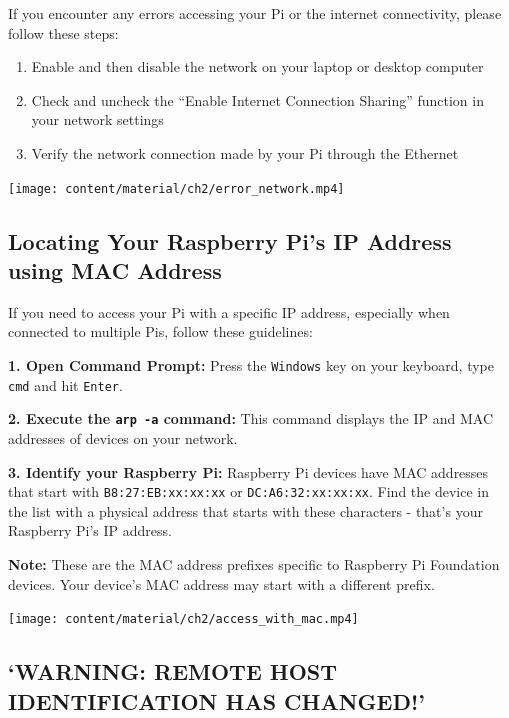 \documentclass[
  letterpaper,
]{scrbook}
\providecommand{\tightlist}{%
  \setlength{\itemsep}{0pt}\setlength{\parskip}{0pt}}\usepackage{longtable,booktabs,array}
\begin{document}
If you encounter any errors accessing your Pi or the internet
connectivity, please follow these steps:

\begin{enumerate}
\def\labelenumi{\arabic{enumi}.}
\tightlist
\item
  Enable and then disable the network on your laptop or desktop computer
\item
  Check and uncheck the ``Enable Internet Connection Sharing'' function
  in your network settings
\item
  Verify the network connection made by your Pi through the Ethernet
\end{enumerate}

\texttt{[image: content/material/ch2/error\_network.mp4]}

\hypertarget{locating-your-raspberry-pis-ip-address-using-mac-address}{%
\subsection{Locating Your Raspberry Pi's IP Address using MAC
Address}\label{locating-your-raspberry-pis-ip-address-using-mac-address}}

If you need to access your Pi with a specific IP address, especially
when connected to multiple Pis, follow these guidelines:

\textbf{1. Open Command Prompt:} Press the \texttt{Windows} key on your
keyboard, type \texttt{cmd} and hit \texttt{Enter}.

\textbf{2. Execute the \texttt{arp\ -a} command:} This command displays
the IP and MAC addresses of devices on your network.

\textbf{3. Identify your Raspberry Pi:} Raspberry Pi devices have MAC
addresses that start with \texttt{B8:27:EB:xx:xx:xx} or
\texttt{DC:A6:32:xx:xx:xx}. Find the device in the list with a physical
address that starts with these characters - that's your Raspberry Pi's
IP address.

\textbf{Note:} These are the MAC address prefixes specific to Raspberry
Pi Foundation devices. Your device's MAC address may start with a
different prefix.

\texttt{[image: content/material/ch2/access\_with\_mac.mp4]}

\hypertarget{warning-remote-host-identification-has-changed}{%
\subsection{`WARNING: REMOTE HOST IDENTIFICATION HAS
CHANGED!'}\label{warning-remote-host-identification-has-changed}}
\end{document}
